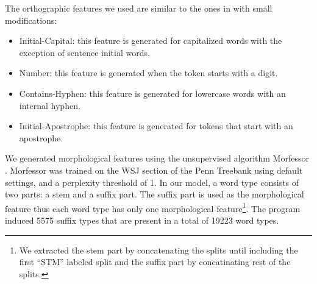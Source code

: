 
The orthographic features we used are similar to the ones in
\cite{bergkirkpatrick-EtAl:2010:NAACLHLT} with small modifications:

\begin{itemize}
\item Initial-Capital: this feature is generated for capitalized words
  with the exception of sentence initial words.
\item Number: this feature is generated when the token starts with a
  digit.
\item Contains-Hyphen: this feature is generated for lowercase words
  with an internal hyphen.
\item Initial-Apostrophe: this feature is generated for tokens that
  start with an apostrophe.
\end{itemize}

We generated morphological features using the unsupervised algorithm
Morfessor \cite{creutz05}.  Morfessor was trained on the WSJ section
of the Penn Treebank using default settings, and a perplexity
threshold of 1.  In our model, a word type consists of two parts: a
stem and a suffix part.  The suffix part is used as the morphological
feature thus each word type has only one morphological
feature\footnote{We extracted the stem part by concatenating the
  splits until including the first ``STM'' labeled split and the
  suffix part by concatinating rest of the splits.}.  The program
induced 5575 suffix types that are present in a total of 19223 word
types.


